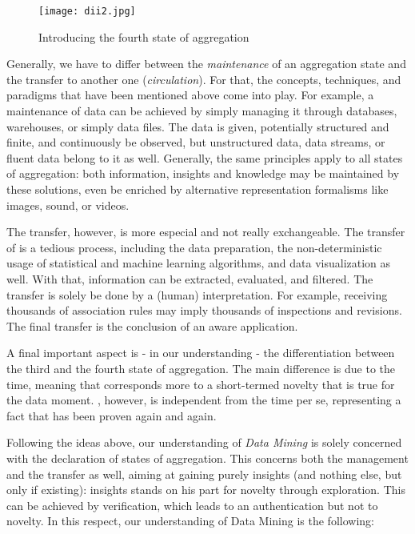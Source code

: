 \documentclass[10pt,latex8]{article}
\begin{document}
\begin{figure}[htbp]
   \centering
   \texttt{[image: dii2.jpg]} 
   \caption{Introducing the fourth state of aggregation }
   \label{fig:dii2}
\end{figure}



Generally, we have to differ between the \textit{maintenance} of an aggregation state and the transfer to another one (\textit{circulation}). For that, the concepts, techniques, and paradigms that have been mentioned above come into play. For example, a maintenance of data can be achieved by simply managing it through databases, warehouses, or simply data files. The data is given, potentially structured and finite, and continuously be observed, but unstructured data, data streams, or fluent data belong to it as well. Generally, the same principles apply to all states of aggregation: both information, insights and knowledge may be maintained by these solutions, even be enriched by alternative representation formalisms like images, sound, or videos.

The transfer, however, is more especial and not really exchangeable. The transfer of  is a tedious process, including the data preparation, the non-deterministic usage of statistical and machine learning algorithms, and data visualization as well. With that, information can be extracted, evaluated, and filtered. The transfer  is solely be done by a (human) interpretation. For example, receiving thousands of association rules may imply thousands of inspections and revisions. The final transfer  is the conclusion of an aware application.

A final important aspect is - in our understanding - the differentiation between the third and the fourth state of aggregation. The main difference is due to the time, meaning that  corresponds more to a short-termed novelty that is true for the data moment. , however, is independent from the time per se, representing a fact that has been proven again and again. 

\label{def}
Following the ideas above, our understanding of \textit{Data Mining} is solely concerned with the declaration of states of aggregation. This concerns both the management and the transfer as well, aiming at gaining purely insights (and nothing else, but only if existing): insights stands on his part for novelty through exploration. This can be achieved by verification, which leads to an authentication but not to novelty. In this respect, our understanding of Data Mining is the following:
\end{document}
